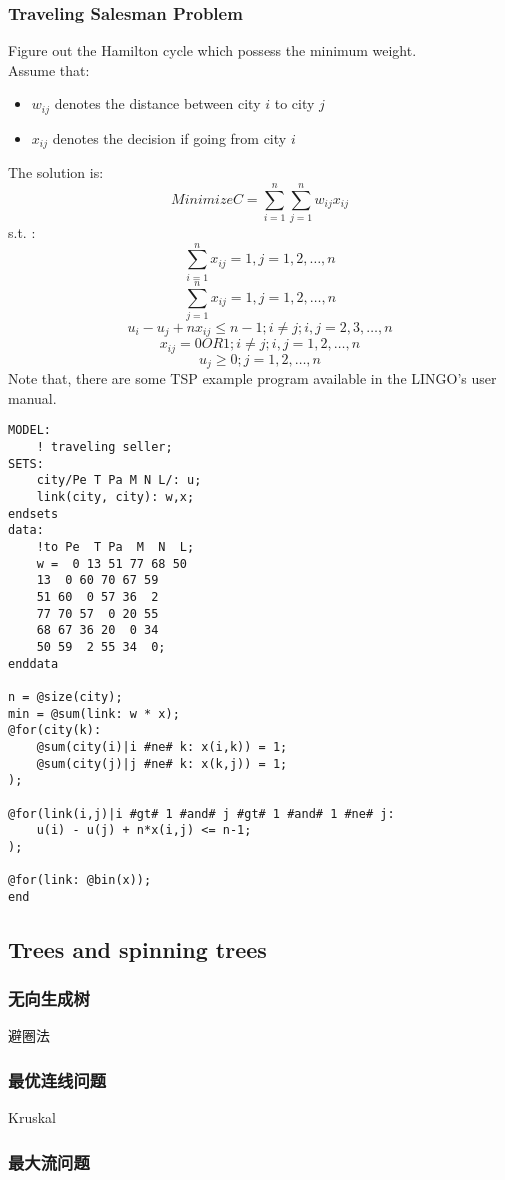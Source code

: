 \documentclass[12pt,a4paper]{article} \usepackage{kurier}
\begin{document}
\begin{CJK}{UTF8}{gkai}
\begin{multicols}{2}
		\subsubsection{Traveling Salesman Problem}
			Figure out the Hamilton cycle which possess the minimum weight.\\
			Assume that:
			\begin{itemize}
			\item $w_{ij}$ denotes the distance between city $i$ to city $j$
			\item $x_{ij}$ denotes the decision if going from city $i$ 
			\end{itemize}
			The solution is:
			\begin{equation} Minimize C = \sum_{i=1}^n \sum_{j=1}^n w_{ij} x_{ij} \end{equation}
			s.t. :
			\[ \sum_{i=1}^n x_{ij} = 1, j = 1,2, \ldots, n \]
			\[ \sum_{j=1}^n x_{ij} = 1, j = 1,2, \ldots, n \]
			\[ u_i - u_{j} + n x_{ij} \leqslant n - 1; i \ne j; i,j = 2,3, \ldots, n \]
			\[ x_{ij} = 0 OR 1; i \ne j; i,j = 1,2, \ldots, n \]
			\[ u_{j} \geqslant 0; j = 1,2, \ldots, n \]
			Note that, there are some TSP example program available in the LINGO's user manual\cite{LINGO.pdf}.
			\begin{verbatim}
MODEL:
	! traveling seller;
SETS:
	city/Pe T Pa M N L/: u;
	link(city, city): w,x;
endsets
data:
	!to Pe  T Pa  M  N  L;
	w =  0 13 51 77 68 50
	13  0 60 70 67 59
	51 60  0 57 36  2
	77 70 57  0 20 55
	68 67 36 20  0 34
	50 59  2 55 34  0;
enddata

n = @size(city);
min = @sum(link: w * x);
@for(city(k):
	@sum(city(i)|i #ne# k: x(i,k)) = 1;
	@sum(city(j)|j #ne# k: x(k,j)) = 1;
);

@for(link(i,j)|i #gt# 1 #and# j #gt# 1 #and# 1 #ne# j:
	u(i) - u(j) + n*x(i,j) <= n-1;
);

@for(link: @bin(x));
end
\end{verbatim}
	\subsection{Trees and spinning trees}
		\subsubsection{无向生成树}
			避圈法
		\subsubsection{最优连线问题}
			Kruskal
		\subsubsection{最大流问题}

\end{multicols}
\end{CJK}
\end{document}
